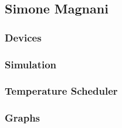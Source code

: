 \subsection{Simone Magnani}






\subsubsection{Devices}
\subsubsection{Simulation}
\subsubsection{Temperature Scheduler}
\subsubsection{Graphs}




